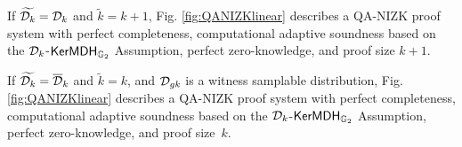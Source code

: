 \begin{theorem} If $\widetilde{\mathcal{D}_{k}}=\mathcal{D}_k$ and $\tilde{k}=k+1$,  Fig. \ref{fig:QANIZKlinear} describes a QA-NIZK
proof system with perfect completeness, computational adaptive soundness based on the  $\mathcal{D}_{k}$-$\mathsf{KerMDH}{}_{\mathbb{G}_2}$ Assumption, perfect zero-knowledge, and proof size $k+1$. 
\label{theo:qanizk1}
\end{theorem}

\begin{theorem} If $\widetilde{\mathcal{D}_{k}}=\overline{\mathcal{D}}_k$ and $\tilde{k}=k$,  and $\mathcal{D}_{gk}$ is a witness samplable distribution, Fig. \ref{fig:QANIZKlinear} describes a QA-NIZK
proof system with perfect completeness, computational adaptive soundness based on the  $\mathcal{D}_{k}$-$\mathsf{KerMDH}{}_{\mathbb{G}_2}$ Assumption, perfect zero-knowledge, and proof size~$k$. 
\label{theo:qanizk2}
\end{theorem}
